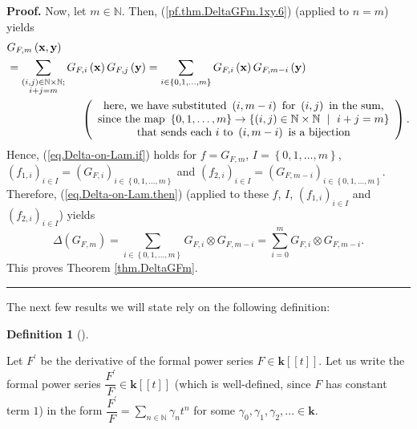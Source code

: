 \documentclass[numbers=enddot,12pt,final,onecolumn,notitlepage]{scrartcl}%
\theoremstyle{definition}
\newtheorem{defi}[theo]{Definition}
\newenvironment{definition}[1][]
{\begin{defi}[#1]\begin{leftbar}}
{\end{leftbar}\end{defi}}
\newenvironment{proof}[1][Proof]{\noindent\textbf{#1.} }{\ \rule{0.5em}{0.5em}}
\let\sumnonlimits\sum
\renewcommand{\sum}{\sumnonlimits\limits}
\newenvironment{verlong}{}{}
\begin{document}
\begin{verlong}
\begin{proof}
Now, let $m\in\mathbb{N}$. Then, (\ref{pf.thm.DeltaGFm.1xy.6}) (applied to
$n=m$) yields
\begin{align*}
&  G_{F,m}\left(  \mathbf{x},\mathbf{y}\right) \\
&  =\sum_{\substack{\left(  i,j\right)  \in\mathbb{N}\times\mathbb{N}%
;\\i+j=m}}G_{F,i}\left(  \mathbf{x}\right)  G_{F,j}\left(  \mathbf{y}\right)
=\sum_{i\in\left\{  0,1,\ldots,m\right\}  }G_{F,i}\left(  \mathbf{x}\right)
G_{F,m-i}\left(  \mathbf{y}\right) \\
&  \ \ \ \ \ \ \ \ \ \ \ \ \ \ \ \ \ \ \ \ \left(
\begin{array}
[c]{c}%
\text{here, we have substituted }\left(  i,m-i\right)  \text{ for }\left(
i,j\right)  \text{ in the sum,}\\
\text{since the map }\left\{  0,1,\ldots,m\right\}  \rightarrow\left\{
\left(  i,j\right)  \in\mathbb{N}\times\mathbb{N}\ \mid\ i+j=m\right\} \\
\text{that sends each }i\text{ to }\left(  i,m-i\right)  \text{ is a
bijection}%
\end{array}
\right)  .
\end{align*}
Hence, (\ref{eq.Delta-on-Lam.if}) holds for $f=G_{F,m}$, $I=\left\{
0,1,\ldots,m\right\}  $, $\left(  f_{1,i}\right)  _{i\in I}=\left(
G_{F,i}\right)  _{i\in\left\{  0,1,\ldots,m\right\}  }$ and $\left(
f_{2,i}\right)  _{i\in I}=\left(  G_{F,m-i}\right)  _{i\in\left\{
0,1,\ldots,m\right\}  }$. Therefore, (\ref{eq.Delta-on-Lam.then}) (applied to
these $f$, $I$, $\left(  f_{1,i}\right)  _{i\in I}$ and $\left(
f_{2,i}\right)  _{i\in I}$) yields%
\[
\Delta\left(  G_{F,m}\right)  =\sum_{i\in\left\{  0,1,\ldots,m\right\}
}G_{F,i}\otimes G_{F,m-i}=\sum_{i=0}^{m}G_{F,i}\otimes G_{F,m-i}.
\]
This proves Theorem \ref{thm.DeltaGFm}.
\end{proof}
\end{verlong}

The next few results we will state rely on the following definition:

\begin{definition}
\label{def.Fprime} Let $F^{\prime}$ be the derivative of the formal power
series $F\in\mathbf{k}\left[  \left[  t\right]  \right]  $. Let us write the
formal power series $\dfrac{F^{\prime}}{F}\in\mathbf{k}\left[  \left[
t\right]  \right]  $ (which is well-defined, since $F$ has constant term $1$)
in the form $\dfrac{F^{\prime}}{F}=\sum_{n\in\mathbb{N}}\gamma_{n}t^{n}$ for
some $\gamma_{0},\gamma_{1},\gamma_{2},\ldots\in\mathbf{k}$.
\end{definition}
\end{document}
